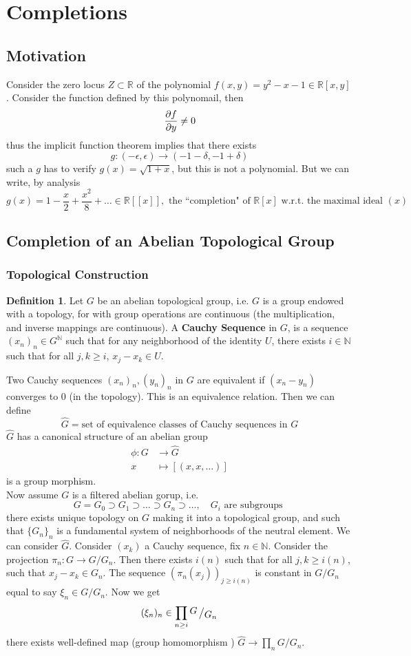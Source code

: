\documentclass[12pt]{article}
\newcommand{\n}{\mathbb{N}}
\newcommand{\bigslant}[2]{{\raisebox{.2em}{$#1$}\left/\raisebox{-.2em}{$#2$}\right.}}
\newcommand{\mapping}[5]{\begin{align*}
#1\colon #2 &\to #3\\
#4 & \mapsto #5
\end{align*}}
\def\r{\mathbb{R}}
\theoremstyle{definition}
\newtheorem{definition}[theorem]{Definition}
\begin{document}
\section*{Completions}
\subsection*{Motivation}
Consider the zero locus $Z\subset \r$ of the polynomial $f(x,y) = y^2-x-1 \in \r[x,y]$. Consider the function defined by this polynomail, then
\[
\pdv{f}{y}(0,-1) \neq 0
\]
thus the implicit function theorem implies that there exists 
\[
g:(-\epsilon,\epsilon) \rightarrow (-1-\delta , -1+\delta)
\]
such a $g$ has to verify $g(x) = \sqrt{1+x}$, but this is not a polynomial. But we can write, by analysis
\[
g(x) = 1-\frac{x}{2}+\frac{x^2}{8} + \dots \in \r [[x]], \text{ the ``completion" of }\r[x]\text{ w.r.t. the maximal ideal }(x)
\]

\subsection*{Completion of an Abelian Topological Group}
\subsubsection*{Topological Construction}
\begin{definition}
Let $G$ be an abelian topological group, i.e. $G$ is a group endowed with a topology, for with group operations are continuous (the multiplication, and inverse mappings are continuous). A \textbf{Cauchy Sequence} in $G$, is a sequence $(x_n)_n \in G^\n$ such that for any neighborhood of the identity $U$, there exists $i\in \n$ such that for all $j,k \geq i$, $x_j - x_k \in U$.
\end{definition}
Two Cauchy sequences $(x_n)_n, (y_n)_n $ in $G$ are equivalent if $(x_n - y_n)$ converges to $0$ (in the topology). This is an equivalence relation. Then we can define
\[
\hat{G} = \text{set of equivalence classes of Cauchy sequences in $G$}
\]
$\hat{G}$ has a canonical structure of an abelian group 
\[
\mapping{\phi}{G}{\hat{G}}{x}{[(x,x,\dots)]}
\]
is a group morphism. \\

Now assume $G$ is a filtered abelian gorup, i.e.
\[
G = G_0 \supset G_1 \supset \dots \supset G_n \supset \dots, \quad G_i \text{ are subgroups }
\]
there exists unique topology on $G$ making it into a topological group, and such that $\{G_n\}_n$ is a fundamental system of neighborhoods of the neutral element. We can consider $\hat{G}$. Consider $(x_k)$ a Cauchy sequence, fix $n\in \n$. Consider the projection $\pi_n : G\rightarrow G/G_n$. Then there exists $i(n)$ such that for all $j,k \geq i(n)$, such that $x_j-x_k \in G_n$. The sequence $(\pi_n(x_j))_{j\geq i(n)}$ is constant in $G/G_n$ equal to say $\xi_n \in G/G_n$. Now we get
\[
(\xi_n)_n \in \prod_{n\geq i} \bigslant{G}{G_n}
\]
there exists well-defined map (group homomorphism ) $\hat{G} \rightarrow \prod_n G/G_n$. 
\end{document}
